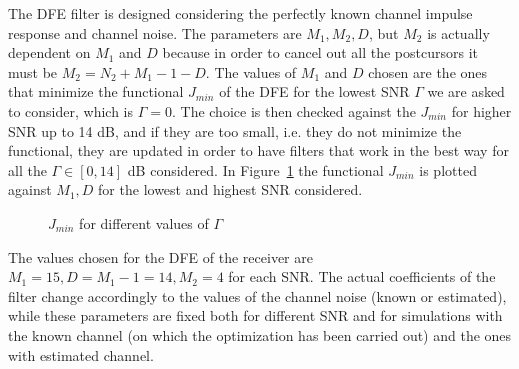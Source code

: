 \documentclass[10pt]{article}
\begin{document}
The DFE filter is designed considering the perfectly known channel impulse response and channel noise. The parameters are $M_1, M_2, D$, but $M_2$ is actually dependent on $M_1$ and $D$ because in order to cancel out all the postcursors it must be $M_2 = N_2 + M_1 - 1 - D$. The values of $M_1$ and $D$ chosen are the ones
that minimize the functional $J_{min}$ of the DFE for the lowest SNR $\Gamma$ we are asked to consider, which is $\Gamma = 0$. The choice is then checked against the $J_{min}$ for higher SNR up to 14 dB, and if they are too small, i.e. they do not minimize the functional, they are updated in order to have filters that work in the best way for all the $\Gamma \in [0, 14]$ dB considered. In Figure~\ref{fig:jmin_DFE} the functional $J_{min}$ is plotted against $M_1, D$ for the lowest and highest SNR considered. 
\begin{figure}[h!]
	\centering
	\caption{$J_{min}$ for different values of $\Gamma$}
	\label{fig:jmin_DFE}
\end{figure}

The values chosen for the DFE of the receiver are $M_1 = 15, D = M_1 - 1 = 14, M_2 = 4$ for each SNR. The actual coefficients of the filter change accordingly to the values of the channel noise (known or estimated), while these parameters are fixed both for different SNR and for simulations with the known channel (on which the optimization has been carried out) and the ones with estimated channel.
\end{document}
